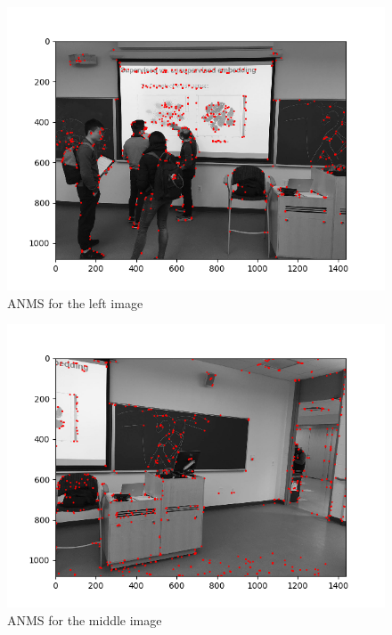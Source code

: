 \documentclass[10pt]{article}
\begin{document}
	\begin{figure}[h]
		\caption{ANMS for the left image}
		\centering
		\includegraphics{anmsL.png}
	\end{figure}
	
	\begin{figure}[h]
		\caption{ANMS for the middle image}
		\centering
		\includegraphics{anmsM.png}
	\end{figure}
\end{document}
